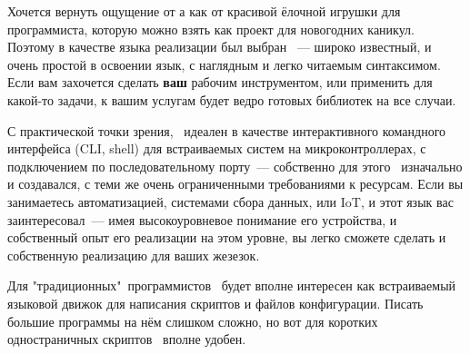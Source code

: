 Хочется вернуть ощущение от \F а как от красивой ёлочной игрушки для
программиста, которую можно взять как проект для новогодних каникул. Поэтому в
качестве языка реализации был выбран \py\ --- широко известный, и очень простой
в освоении язык, с наглядным и легко читаемым синтаксимом. Если вам захочется
сделать \textbf{ваш \F} рабочим инструментом, или применить для какой-то задачи,
к вашим услугам будет ведро готовых библиотек на все случаи.

С практической точки зрения, \F\ идеален в качестве интерактивного командного
интерфейса (CLI, shell) для встраиваемых систем на микроконтроллерах, с
подключением по последовательному порту\ --- собственно для этого \F\ изначально
и создавался, с теми же очень ограниченными требованиями к ресурсам. Если вы
занимаетесь автоматизацией, системами сбора данных, или IoT, и этот язык вас
заинтересовал\ --- имея высокоуровневое понимание его устройства, и собственный
опыт его реализации на этом уровне, вы легко сможете сделать и собственную
реализацию для ваших жезезок.

Для "традиционных"\ программистов \F\ будет вполне интересен как встраиваемый
языковой движок для написания скриптов и файлов конфигурации. Писать большие
программы на нём слишком сложно, но вот для коротких одностраничных скриптов \F\
вполне удобен.
